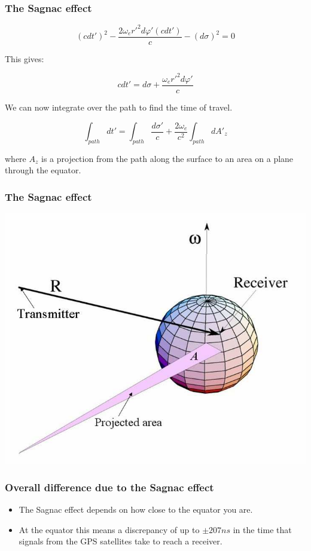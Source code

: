 \documentclass[xcolor=dvipsnames,usepdftitle=false]{beamer}
\renewcommand\phi{\varphi}
\begin{document}
\begin{frame}

\frametitle{The Sagnac effect}

\[(cdt')^2 - \frac{2\omega_{e} {r'}^2 d\phi' (cdt')}{c} - (d \sigma)^2 = 0 \]

This gives:

\[c dt' = d\sigma + \frac{\omega_{e} {r'}^2 d\phi'}{c}\]

\vspace{\baselineskip}

We can now integrate over the path to find the time of travel. 

\[\int_{path} dt' = \int_{path} \frac{d \sigma'}{c} + \frac{2\omega_{e}}{c^2} \int_{path} d {A'}_{z} \]

where $A_z$ is a projection from the path along the surface to an area on a plane through the equator.
\end{frame}

\begin{frame}

\frametitle{The Sagnac effect}

\includegraphics[scale=0.4]{images/sagnac.png}

\end{frame}

\begin{frame}

\frametitle{Overall difference due to the Sagnac effect}

\begin{itemize}
	\item The Sagnac effect depends on how close to the equator you are. \vspace{\baselineskip}
	\item At the equator this means a discrepancy of up to $\pm 207 ns$ in the time that signals from the GPS satellites take to reach a receiver.
\end{itemize}

\end{frame}
\end{document}
